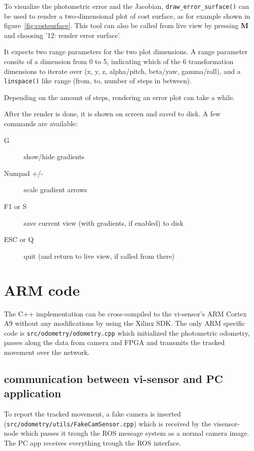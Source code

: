 To visualize the photometric error and the Jacobian,
\texttt{draw\_error\_surface()} can be used to render a two-dimensional plot of
cost surface, as for example shown in figure~\ref{fig:costsurface}. This tool
can also be called from live view by pressing \textbf{M} and choosing '12:
render error surface'.

It expects two range parameters for the two plot dimensions. A range parameter
consits of a dimension from 0 to 5, indicating which of the 6 transformation
dimensions to iterate over (x, y, z, alpha/pitch, beta/yaw, gamma/roll), and a
\texttt{linspace()} like range (from, to, number of steps in between).

Depending on the amount of steps, rendering an error plot can take a while.

After the render is done, it is shown on screen and saved to disk. A few commands are available:

\begin{description}
    \item[G] show/hide gradients
    \item[Numpad +/-] scale gradient arrows
    \item[F1 or S] save current view (with gradients, if enabled) to disk
    \item[ESC or Q] quit (and return to live view, if called from there)
\end{description}


\section{ARM code}

The C++ implementation can be cross-compiled to the vi-sensor's ARM Cortex A9
without any modifications by using the Xilinx SDK. The only ARM specific code
is \texttt{src/odometry/odometry.cpp} which initialized the photometric odometry, passes
along the data from camera and FPGA and transmits the tracked movement over the
network.

\subsection{communication between vi-sensor and PC application}

To report the tracked movement, a fake camera is inserted
(\texttt{src/odometry/utils/FakeCamSensor.cpp}) which is received by the
visensor-node which passes it trough the ROS message system as a normal camera
image. The PC app receives everything trough the ROS interface.


